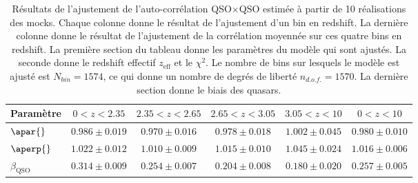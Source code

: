 \begin{table}[h]
  \centering
  \caption{Résultats de l'ajustement de l'auto-corrélation QSO$\times$QSO estimée à partir de 10 réalisations des mocks. Chaque colonne donne le résultat de l'ajustement d'un bin en redshift. La dernière colonne donne le résultat de l'ajustement de la corrélation moyennée sur ces quatre bins en redshift. La première section du tableau donne les paramètres du modèle qui sont ajustés. La seconde donne le redshift effectif $z_{\mathrm{eff}}$  et le $\chi^2$. Le nombre de bins sur lesquels le modèle est ajusté est $N_{bin} = \num{1574}$, ce qui donne un nombre de degrés de liberté $n_{d.o.f.} = \num{1570}$. La dernière section donne le biais des quasars.}
  \label{tab:auto_qso_4bins}
  \begin{tabular}{lccccc}
\toprule
Param\`etre  & $\num{0} < z < \num{2.35}$ & $\num{2.35} < z < \num{2.65}$ & $\num{2.65} < z < \num{3.05}$ & $\num{3.05} < z < \num{10}$  & $\num{0} < z < \num{10}$ \\
\midrule
$\apar{} $ & $ 0.986 \pm 0.019$ & $ 0.970 \pm 0.016$ & $ 0.978 \pm 0.018$ & $ 1.002 \pm 0.045$ & $ 0.980 \pm 0.010$ \\
$\aperp{} $ & $ 1.022 \pm 0.012$ & $ 1.010 \pm 0.009$ & $ 1.015 \pm 0.010$ & $ 1.045 \pm 0.024$ & $ 1.016 \pm 0.006$ \\
$\beta_{\mathrm{QSO}} $ & $ 0.314 \pm 0.009$ & $ 0.254 \pm 0.007$ & $ 0.204 \pm 0.008$ & $ 0.180 \pm 0.020$ & $ 0.257 \pm 0.005$ \\

\end{tabular}
\end{table}

